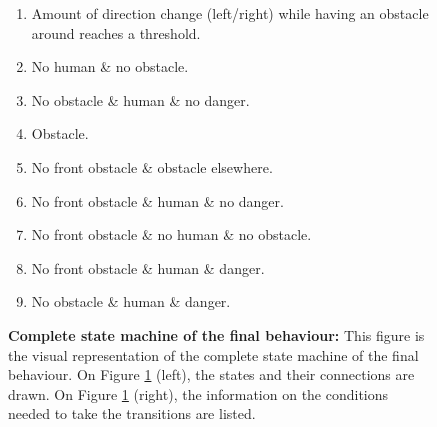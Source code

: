 \documentclass[oneside, a4paper, 12pt]{memoir}
\let\oldCaption\caption
\renewcommand{\caption}[2]{
\oldCaption[#1]{{\small\sffamily\bfseries #1:} #2}
}
\begin{document}
\begin{figure}[!htp]
\begin{minipage}[c]{.49\textwidth}
{\begin{tikzpicture}[->, >=stealth', shorten >=1pt, auto, node distance=4cm, semithick]
			\end{tikzpicture}
			}
		\end{minipage}
		\hfill
		\begin{minipage}[c]{.49\textwidth}
			\small\sffamily
			
			\begin{enumerate}
				\item Amount of direction change (left/right) while having an obstacle around reaches a threshold.
				\item No human \& no obstacle.
				\item No obstacle \& human \& no danger.
				\item Obstacle.
				\item No front obstacle \& obstacle elsewhere.
				\item No front obstacle \& human \& no danger.
				\item No front obstacle \& no human \& no obstacle.
				\item No front obstacle \& human \& danger.
				\item No obstacle \& human \& danger.
	
				\end{enumerate}
	
		\end{minipage}
		
		\caption{Complete state machine of the final behaviour}{This figure is the visual representation of the complete state machine of the final behaviour. On Figure \ref{fig:state_machine_complete} (left), the states and their connections are drawn. On Figure \ref{fig:state_machine_complete} (right), the information on the conditions needed to take the transitions are listed.}
		\label{fig:state_machine_complete}
	\end{figure}
\end{document}
